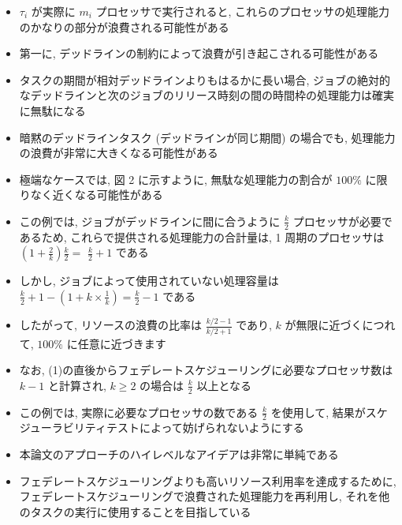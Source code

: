 \begin{frame}{}
    \begin{itemize}
        \item $\tau_{i}$ が実際に $m_{i}$ プロセッサで実行されると, これらのプロセッサの処理能力のかなりの部分が浪費される可能性がある
\item 第一に, デッドラインの制約によって浪費が引き起こされる可能性がある
\item タスクの期間が相対デッドラインよりもはるかに長い場合, ジョブの絶対的なデッドラインと次のジョブのリリース時刻の間の時間枠の処理能力は確実に無駄になる
\item 暗黙のデッドラインタスク (デッドラインが同じ期間) の場合でも, 処理能力の浪費が非常に大きくなる可能性がある
\item 極端なケースでは, 図 2 に示すように, 無駄な処理能力の割合が $100 \%$ に限りなく近くなる可能性がある
\item この例では, ジョブがデッドラインに間に合うように $\frac{k}{2}$ プロセッサが必要であるため, これらで提供される処理能力の合計量は, 1 周期のプロセッサは $\left(1+\frac{2}{k}\right) \frac{k}{2}=$  $\frac{k}{2}+1$ である
\item しかし, ジョブによって使用されていない処理容量は $\frac{k}{2}+1-\left(1+k \times \frac{1}{k}\right)=\frac{k}{2}-1$ である
\item したがって, リソースの浪費の比率は $\frac{k / 2-1}{k / 2+1}$ であり, $k$ が無限に近づくにつれて, $100 \%$ に任意に近づきます
\item なお, (1)の直後からフェデレートスケジューリングに必要なプロセッサ数は $k-1$ と計算され, $k \geq 2$ の場合は $\frac{k}{2}$ 以上となる
\item この例では, 実際に必要なプロセッサの数である $\frac{k}{2}$ を使用して, 結果がスケジューラビリティテストによって妨げられないようにする
    \end{itemize}
\end{frame}

\begin{frame}{}
    \begin{itemize}
        \item 本論文のアプローチのハイレベルなアイデアは非常に単純である
\item フェデレートスケジューリングよりも高いリソース利用率を達成するために, フェデレートスケジューリングで浪費された処理能力を再利用し, それを他のタスクの実行に使用することを目指している
    \end{itemize}
\end{frame}

